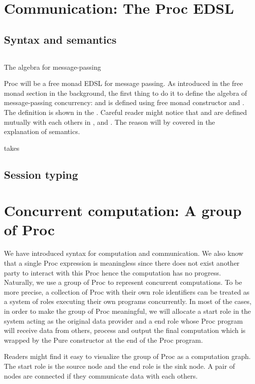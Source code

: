 \section{Communication: The Proc EDSL}
\subsection{Syntax and semantics}
\begin{listing}[ht]
    \inputminted{Haskell}{spar/procf.hs}
    \caption{The algebra for message-passing}
    \label{spar:code:procf}
\end{listing}
Proc will be a free monad EDSL for message passing. As introduced in the free monad section in the background, the first thing to do it to define the algebra of message-passing concurrency:  and  is defined using free monad constructor and . The definition is shown in the . Careful reader might notice that  and  are defined mutually with each others in ,  and . The reason will by covered in the explanation of semantics.

 takes

\subsection{Session typing}
\section{Concurrent computation: A group of Proc}
We have introduced syntax for computation and communication. We also know that a single Proc expression is meaningless since there does not exist another party to interact with this Proc hence the computation has no progress. Naturally, we use a group of Proc to represent concurrent computations. To be more precise, a collection of Proc with their own role identifiers can be treated as a system of roles executing their own programs concurrently. In most of the cases, in order to make the group of Proc meaningful, we will allocate a start role in the system acting as the original data provider and a end role whose Proc program will receive data from others, process and output the final computation which is wrapped by the Pure constructor at the end of the Proc program. 

Readers might find it easy to visualize the group of Proc as a computation graph. The start role is the source node and the end role is the sink node. A pair of nodes are connected if they communicate data with each others.

